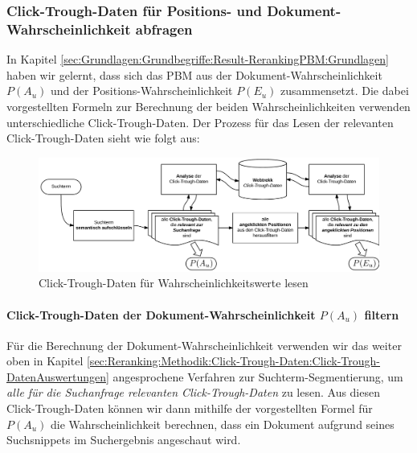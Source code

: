 \subsubsection{Click-Trough-Daten für Positions- und Dokument-Wahrscheinlichkeit abfragen}
\label{sec:Reranking:Methodik:Result-RerankingPBM:PositionDokumentWahrscheinlichkeiten}

In Kapitel \ref{sec:Grundlagen:Grundbegriffe:Result-RerankingPBM:Grundlagen} haben wir gelernt, dass sich das PBM aus der Dokument-Wahrscheinlichkeit $P(A_{u})$ und der Positions-Wahrscheinlichkeit $P(E_{u})$ zusammensetzt. Die dabei vorgestellten Formeln zur Berechnung der beiden Wahrscheinlichkeiten verwenden unterschiedliche Click-Trough-Daten. Der Prozess für das Lesen der relevanten Click-Trough-Daten sieht wie folgt aus:

\begin{figure}[H]
\centering
\vspace{-1em}
\caption[Click-Trough-Daten für Wahrscheinlichkeitswerte lesen]{Click-Trough-Daten für Wahrscheinlichkeitswerte lesen}
\label{fig:WahrscheinlichkeitswerteCTDaten}
\includegraphics[width=\linewidth]{gfx/WahrscheinlichkeitswerteCTDaten}
\vspace{-2.5em}
\end{figure}

\paragraph{Click-Trough-Daten der Dokument-Wahrscheinlichkeit $P(A_{u})$ filtern}
Für die Berechnung der Dokument-Wahrscheinlichkeit verwenden wir das weiter oben in Kapitel \ref{sec:Reranking:Methodik:Click-Trough-Daten:Click-Trough-DatenAuswertungen} angesprochene Verfahren zur Suchterm-Segmentierung, um \textit{alle für die Suchanfrage relevanten Click-Trough-Daten} zu lesen. Aus diesen Click-Trough-Daten können wir dann mithilfe der vorgestellten Formel für $P(A_{u})$ die Wahrscheinlichkeit berechnen, dass ein Dokument aufgrund seines Suchsnippets im Suchergebnis angeschaut wird.  

